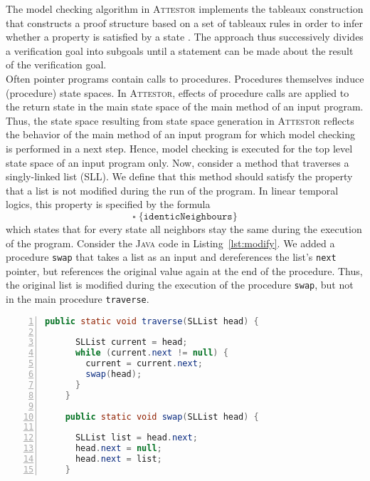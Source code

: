 \documentclass[a4paper, 12pt, twoside]{report}
\begin{document}
	The model checking algorithm in \textsc{Attestor} implements the tableaux construction  that constructs a proof structure based on a set of tableaux rules in order to infer whether a property is satisfied by a state \cite{bhat1995efficient}. The approach thus successively divides a verification goal into subgoals until a statement can be made about the result of the verification goal.\\
	
	Often pointer programs contain calls to procedures. Procedures themselves induce (procedure) state spaces. In \textsc{Attestor}, effects of procedure calls are applied to the return state in the main state space of the main method of an input program. Thus, the state space resulting from state space generation in \textsc{Attestor} reflects the behavior of the main method of an input program for which model checking is performed in a next step. Hence, model checking is executed for the top level state space of an input program only. Now, consider a method that traverses a singly-linked list (SLL). We define that this method should satisfy the property that a list is not modified during the run of the program. In linear temporal logics, this property is specified by the formula \[\square\;\{\texttt{identicNeighbours}\}\] which states that for every state all neighbors stay the same during the execution of the program. Consider the \textsc{Java} code in Listing~\ref{lst:modify}. We added a procedure \texttt{swap} that takes a list as an input and dereferences the list's \texttt{next} pointer, but references the original value again at the end of the procedure. Thus, the original list is modified during the execution of the procedure \texttt{swap}, but not in the main procedure \texttt{traverse}. 
	
	\begin{lstlisting}[language=Java,numbers=left,
	stepnumber=1,keywordstyle=\color{blue},frame=single,caption={\textsc{Java} code for traversing a singly-linked list that contains erroneous behaviour in a called procedure.},captionpos=b,label={lst:modify}]	  
	public static void traverse(SLList head) {
	
	  SLList current = head;	
	  while (current.next != null) {
	    current = current.next;
	    swap(head);
	  }
	}
	
	public static void swap(SLList head) {
	
	  SLList list = head.next;
	  head.next = null;
	  head.next = list;
	}	
	\end{lstlisting}
	
\end{document}
